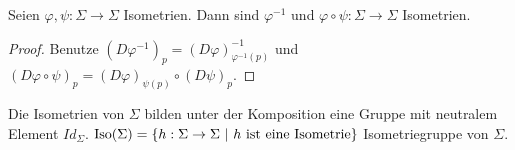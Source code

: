 \documentclass[../main.tex]{subfiles}
\begin{document}
\begin{lemma}
    Seien $\varphi , \psi : \Sigma \to \Sigma $ Isometrien. Dann sind $\varphi ^{-1}$ und $\varphi \circ \psi : \Sigma \to \Sigma$ Isometrien.
\end{lemma}
\begin{proof}
    Benutze $(D\varphi^{-1})_p=(D\varphi)^{-1}_{\varphi^{-1}(p)}$ und $(D\varphi \circ \psi)_p=(D\varphi)_{\psi (p)}\circ (D\psi)_{p}$.
\end{proof}
\begin{consequence}
    Die Isometrien von $\Sigma$ bilden unter der Komposition eine Gruppe mit neutralem Element $Id_{\Sigma}$.
    $\operatorname{Iso}(\Sigma)= \{h: \Sigma \to \Sigma \ | \ h \text{ ist eine Isometrie} \}$ Isometriegruppe von $\Sigma$.
\end{consequence}
\end{document}

